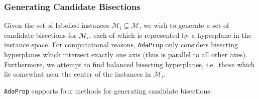 \documentclass[a4paper,12pt]{article} %
\newcommand{\AdaProp}{\texttt{AdaProp}\xspace}
\newcommand{\mcl}[1]{\mathcal{#1}}
\begin{document}
\subsubsection{Generating Candidate Bisections}
\label{secCandGen}

Given the set of labelled instances $\mcl{M}_i \subseteq \mcl{M}$,
    we wish to generate a set of candidate bisections for $\mcl{M}_i$,
    each of which is represented by a hyperplane in the instance space.
For computational reasons, 
    \AdaProp only considers bisecting hyperplanes 
    which intersect exactly one axis
    (thus is parallel to all other axes).
Furthermore, we attempt to find balanced bisecting hyperplanes, 
    i.e.\ those which lie somewhat near the center of the instances
    in $\mcl{M}_i$.

\AdaProp supports four methods for generating candidate bisections:
\end{document}
